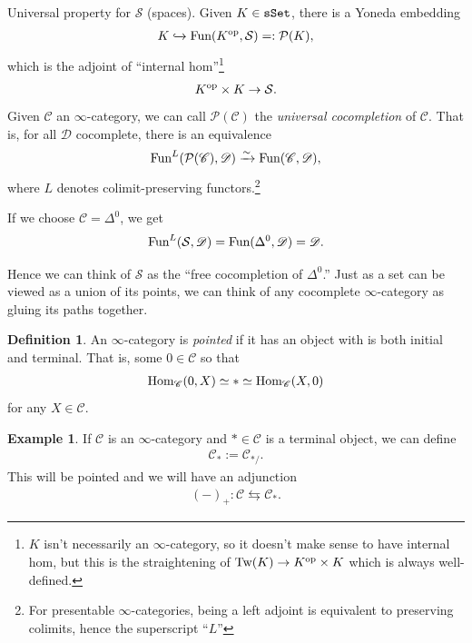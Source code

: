 \documentclass[12pt]{amsart}
\theoremstyle{definition}
\newtheorem{definition}[theorem]{Definition}
\newtheorem{example}[theorem]{Example}
\providecommand{\Tw}{\text{Tw}}
\begin{document}
Universal property for $\mathcal{S}$ (spaces). Given $K\in\texttt{sSet}$, there is a Yoneda embedding
\begin{align*}
    K \xhookrightarrow{} \text{Fun}(K^{\text{op}},\mathcal{S}) =: \mathcal{P}(K),
\end{align*}
which is the adjoint of ``internal hom''\footnote{$K$ isn't necessarily an $\infty$-category, so it doesn't make sense to have internal hom, but this is the straightening of $\Tw(K) \to K^\op \times K$ which is always well-defined.}
\begin{align*}
    K^{\text{op}} \times K \to \mathcal{S}.
\end{align*}
Given $\mathscr{C}$ an $\infty$-category, we can call $\mathcal{P}(\mathscr{C})$ the \textit{universal cocompletion} of $\mathscr{C}$. That is, for all $\mathscr{D}$ cocomplete, there is an equivalence
\begin{align*}
    \text{Fun}^L(\mathcal{P}(\mathscr{C}),\mathscr{D}) \xrightarrow{\sim} \text{Fun}(\mathscr{C},\mathscr{D}),
\end{align*}
where $L$ denotes colimit-preserving functors.\footnote{For presentable $\infty$-categories, being a left adjoint is equivalent to preserving colimits, hence the superscript ``$L$''}

If we choose $\mathscr{C} = \Delta^0$, we get
\begin{align*}
    \text{Fun}^L(\mathcal{S}, \mathscr{D}) = \text{Fun}(\Delta^0, \mathscr{D}) = \mathscr{D}.
\end{align*}

Hence we can think of $\mathcal{S}$ as the ``free cocompletion of $\Delta^0$.'' Just as a set can be viewed as a union of its points, we can think of any cocomplete $\infty$-category as gluing its paths together.

\begin{definition} An $\infty$-category is \textit{pointed} if it has an object with is both initial and terminal. That is, some $0 \in \mathscr{C}$ so that
\begin{align*}
    \text{Hom}_\mathscr{C}(0,X) \simeq \ast \simeq \text{Hom}_\mathscr{C}(X,0)
\end{align*}
for any $X\in \mathscr{C}$.
\end{definition}

\begin{example} If $\mathscr{C}$ is an $\infty$-category and $\ast\in \mathscr{C}$ is a terminal object, we can define
\begin{align*}
    \mathscr{C}_\ast := \mathscr{C}_{\ast/}.
\end{align*}
This will be pointed and we will have an adjunction
\begin{align*}
    (-)_+ : \mathscr{C} \leftrightarrows \mathscr{C}_\ast.
\end{align*}
\end{example}
\end{document}
